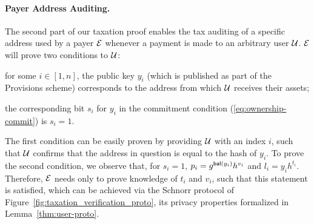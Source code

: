 \paragraph{Payer Address Auditing.}\label{subsec:user-verification-proto}
The second part of our taxation proof enables the tax auditing of a specific
address used by a payer $\mathcal{E}$ whenever a payment is made to an arbitrary  user $\mathcal{U}$. $\mathcal{E}$ will prove two conditions to
$\mathcal{U}$:
\begin{inparaenum}[i)]
    \item for some $i \in [1, n]$, the public key $y_i$ (which is published as
        part of the Provisions scheme) corresponds to the address from which
        $\mathcal{U}$ receives their assets;
    \item the corresponding bit $s_i$ for $y_i$ in the commitment condition
        (\ref{eq:ownership-commit}) is $s_i = 1$.
\end{inparaenum}
The first condition can be easily proven by providing $\mathcal{U}$ with an index
$i$, such that $\mathcal{U}$ confirms that the address in question is equal to the
hash of $y_i$. To prove the second condition, we observe that, for $s_i = 1$,
$p_i = g^{\mathsf{bal}(y_i)}h^{v_i}$ and
$l_i = y_ih^{t_i}$.
Therefore, $\mathcal{E}$ needs only to prove knowledge of $t_i$ and $v_i$, such that this
statement is satisfied, which can be achieved via the Schnorr protocol
of Figure~\ref{fig:taxation_verification_proto}, its privacy properties formalized in
Lemma~\ref{thm:user-proto}.


